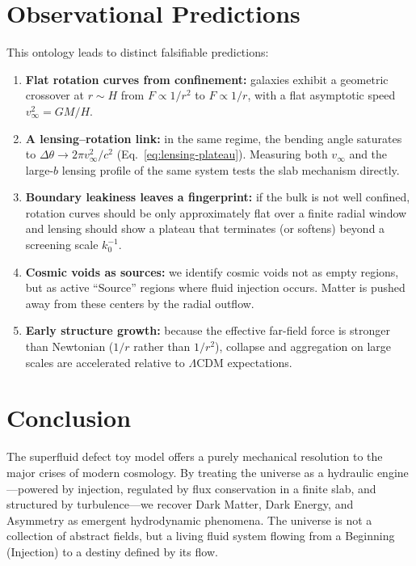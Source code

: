 \documentclass[12pt]{article}
\begin{document}
\section{Observational Predictions}
\label{sec:predictions}

This ontology leads to distinct falsifiable predictions:
\begin{enumerate}
    \item \textbf{Flat rotation curves from confinement:} galaxies exhibit a geometric crossover at $r\sim H$ from $F\propto 1/r^2$ to $F\propto 1/r$, with a flat asymptotic speed $v_\infty^2=GM/H$.
    \item \textbf{A lensing--rotation link:} in the same regime, the bending angle saturates to $\Delta\theta\to 2\pi v_\infty^2/c^2$ (Eq.~\eqref{eq:lensing-plateau}). Measuring both $v_\infty$ and the large-$b$ lensing profile of the same system tests the slab mechanism directly.
    \item \textbf{Boundary leakiness leaves a fingerprint:} if the bulk is not well confined, rotation curves should be only approximately flat over a finite radial window and lensing should show a plateau that terminates (or softens) beyond a screening scale $k_0^{-1}$.
    \item \textbf{Cosmic voids as sources:} we identify cosmic voids not as empty regions, but as active ``Source'' regions where fluid injection occurs. Matter is pushed away from these centers by the radial outflow.
    \item \textbf{Early structure growth:} because the effective far-field force is stronger than Newtonian ($1/r$ rather than $1/r^2$), collapse and aggregation on large scales are accelerated relative to $\Lambda$CDM expectations.
\end{enumerate}



\section{Conclusion}
\label{sec:conclusion}

The superfluid defect toy model offers a purely mechanical resolution to the major crises of modern cosmology. By treating the universe as a hydraulic engine---powered by injection, regulated by flux conservation in a finite slab, and structured by turbulence---we recover Dark Matter, Dark Energy, and Asymmetry as emergent hydrodynamic phenomena. The universe is not a collection of abstract fields, but a living fluid system flowing from a Beginning (Injection) to a destiny defined by its flow.
\end{document}
